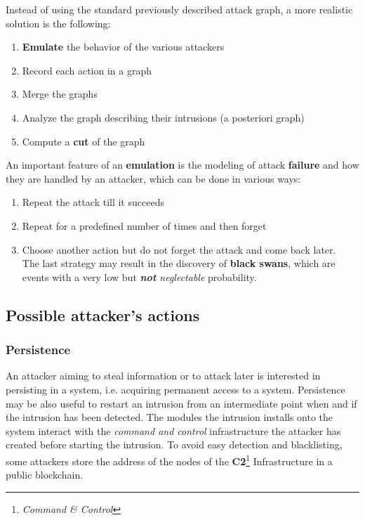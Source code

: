 Instead of using the standard previously described attack graph, a more realistic solution is the following:
\begin{enumerate}
   \item \textbf{Emulate} the behavior of the various attackers
   \item Record each action in a graph
   \item Merge the graphs
   \item Analyze the graph describing their intrusions (a posteriori graph)
   \item Compute a \textbf{cut} of the graph
\end{enumerate}

An important feature of an \textbf{emulation} is the modeling of attack \textbf{failure} and
how they are handled by an attacker, which can be done in various ways:
\begin{enumerate}
   \item Repeat the attack till it succeeds
   \item Repeat for a predefined number of times and then forget
   \item Choose another action but do not forget the attack and come back later.\\
   The last strategy may result in the discovery of \textbf{black swans},
   which are events with a very low but \textit{\textbf{not} neglectable} probability.
\end{enumerate}

\subsection{Possible attacker's actions}
\subsubsection{Persistence}
An attacker aiming to steal information or to attack later is interested in persisting in a system, i.e. acquiring permanent access to a system.
Persistence may be also useful to restart an intrusion from an intermediate point when and if the intrusion has been detected.
The modules the intrusion installs onto the system interact with the \textit{command
and control} infrastructure the attacker has created before starting the
intrusion.
To avoid easy detection and blacklisting,
some attackers store the address of the nodes of the \textbf{C2}\footnote{\textit{Command \& Control}} Infrastructure in a public blockchain.

